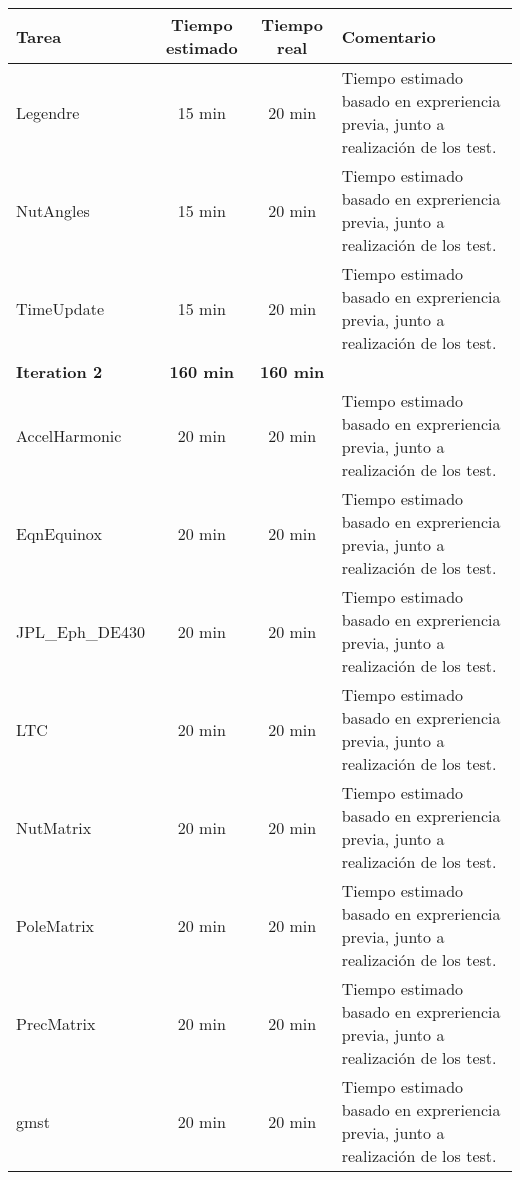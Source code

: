 \documentclass[12pt,a4paper]{article}
\begin{document}
 \begin{center}
    \begin{tabular}{|p{3cm}|c|c|p{6cm}|}
        \hline
        \textbf{Tarea} & \textbf{Tiempo estimado} & \textbf{Tiempo real} & \textbf{Comentario} \\
        \hline
        Legendre & 15 min & 20 min & Tiempo estimado basado en expreriencia previa, junto a realización de los test.\\
        \hline
        NutAngles & 15 min & 20 min & Tiempo estimado basado en expreriencia previa, junto a realización de los test.\\
        \hline
        TimeUpdate & 15 min & 20 min & Tiempo estimado basado en expreriencia previa, junto a realización de los test.\\
        \hline
        \textbf{Iteration 2} & \textbf{160 min} & \textbf{160 min} & \\
        \hline
        AccelHarmonic & 20 min & 20 min & Tiempo estimado basado en expreriencia previa, junto a realización de los test.\\
        \hline
        EqnEquinox & 20 min & 20 min & Tiempo estimado basado en expreriencia previa, junto a realización de los test.\\
        \hline
        JPL\_Eph\_DE430 & 20 min & 20 min & Tiempo estimado basado en expreriencia previa, junto a realización de los test.\\
        \hline
        LTC & 20 min & 20 min & Tiempo estimado basado en expreriencia previa, junto a realización de los test.\\
        \hline
        NutMatrix & 20 min & 20 min & Tiempo estimado basado en expreriencia previa, junto a realización de los test.\\
        \hline
        PoleMatrix & 20 min & 20 min & Tiempo estimado basado en expreriencia previa, junto a realización de los test.\\
        \hline
        PrecMatrix & 20 min & 20 min & Tiempo estimado basado en expreriencia previa, junto a realización de los test.\\
        \hline
        gmst & 20 min & 20 min & Tiempo estimado basado en expreriencia previa, junto a realización de los test.\\
        \hline
    \end{tabular}
\end{center}
\end{document}

